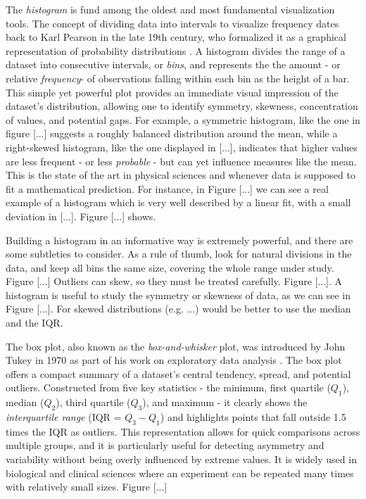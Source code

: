 \documentclass{book}
\begin{document}
The \textit{histogram} is fund among the oldest and most fundamental visualization tools. The concept of dividing data into intervals to visualize frequency dates back to Karl Pearson in the late 19th century, who formalized it as a graphical representation of probability distributions \cite{pearson1892}. A histogram divides the range of a dataset into consecutive intervals, or \textit{bins}, and represents the the amount - or relative \textit{frequency}- of observations falling within each bin as the height of a bar. This simple yet powerful plot provides an immediate visual impression of the dataset’s distribution, allowing one to identify symmetry, skewness, concentration of values, and potential gaps. For example, a symmetric histogram, like the one in figure [...] suggests a roughly balanced distribution around the mean, while a right-skewed histogram, like the one displayed in [...], indicates that higher values are less frequent  - or less \textit{probable} - but can yet influence measures like the mean. This is the state of the art in physical sciences and whenever data is supposed to fit a mathematical prediction. For instance, in Figure [...] we can see a real example of a histogram which is very well described by a linear fit, with a small deviation in [...]. Figure [...] shows.

\medskip

Building a histogram in an informative way is extremely powerful, and there are some subtleties to consider. As a rule of thumb, look for natural divisions in the data, and keep all bins the same size, covering the whole range under study. Figure [...] Outliers can skew, so they must be treated carefully. Figure [...]. A histogram is useful to study the symmetry or skewness of data, as we can see in Figure [...]. For skewed distributions (e.g. ...) would be better to use the median and the IQR.

\medskip

The box plot, also known as the \textit{box-and-whisker} plot, was introduced by John Tukey in 1970 as part of his work on exploratory data analysis \cite{tukey1977}. The box plot offers a compact summary of a dataset’s central tendency, spread, and potential outliers. Constructed from five key statistics - the minimum, first quartile ($Q_1$), median ($Q_2$), third quartile ($Q_3$), and maximum - it clearly shows the \textit{interquartile range} (IQR = $Q_3 - Q_1$) and highlights points that fall outside 1.5 times the IQR as outliers. This representation allows for quick comparisons across multiple groups, and it is particularly useful for detecting asymmetry and variability without being overly influenced by extreme values. It is widely used in biological and clinical sciences where an experiment can be repeated many times with relatively small sizes. Figure [...]
\end{document}

